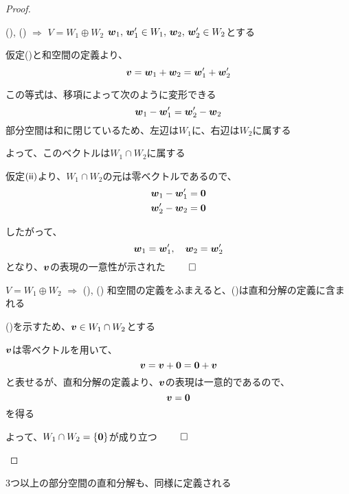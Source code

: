 \documentclass[../../../topic_linear-algebra]{subfiles}
\begin{document}
\begin{proof}
  \begin{subpattern}{(), () $\Longrightarrow$ $V = W_1 \oplus W_2$}
    $\vb*{w}_1,\,\vb*{w}_1' \in W_1, \, \vb*{w}_2,\,\vb*{w}_2' \in W_2$とする

    仮定()と和空間の定義より、
    \begin{equation*}
      \vb*{v} = \vb*{w}_1 + \vb*{w}_2 = \vb*{w}_1' + \vb*{w}_2'
    \end{equation*}

    この等式は、移項によって次のように変形できる
    \begin{equation*}
      \vb*{w}_1 - \vb*{w}_1' = \vb*{w}_2' - \vb*{w}_2
    \end{equation*}
    部分空間は和に閉じているため、左辺は$W_1$に、右辺は$W_2$に属する

    よって、このベクトルは$W_1 \cap W_2$に属する

    仮定$(\textsf{ii})$より、$W_1 \cap W_2$の元は零ベクトルであるので、
    \begin{align*}
      \vb*{w}_1 - \vb*{w}_1' & = \vb*{0} \\
      \vb*{w}_2' - \vb*{w}_2 & = \vb*{0}
    \end{align*}

    したがって、
    \begin{equation*}
      \vb*{w}_1 = \vb*{w}_1', \quad \vb*{w}_2 = \vb*{w}_2'
    \end{equation*}
    となり、$\vb*{v}$の表現の一意性が示された $\qed$
  \end{subpattern}

  \begin{subpattern}{$V = W_1 \oplus W_2$ $\Longrightarrow$ (), ()}
    和空間の定義をふまえると、()は直和分解の定義に含まれる

    \br

    ()を示すため、$\vb*{v} \in W_1 \cap W_2$とする

    $\vb*{v}$は零ベクトルを用いて、
    \begin{equation*}
      \vb*{v} = \vb*{v} + \vb*{0} = \vb*{0} + \vb*{v}
    \end{equation*}
    と表せるが、直和分解の定義より、$\vb*{v}$の表現は一意的であるので、
    \begin{equation*}
      \vb*{v} = \vb*{0}
    \end{equation*}
    を得る

    よって、$W_1 \cap W_2 = \{ \vb*{0} \}$が成り立つ $\qed$
  \end{subpattern}
\end{proof}

3つ以上の部分空間の直和分解も、同様に定義される
\end{document}
